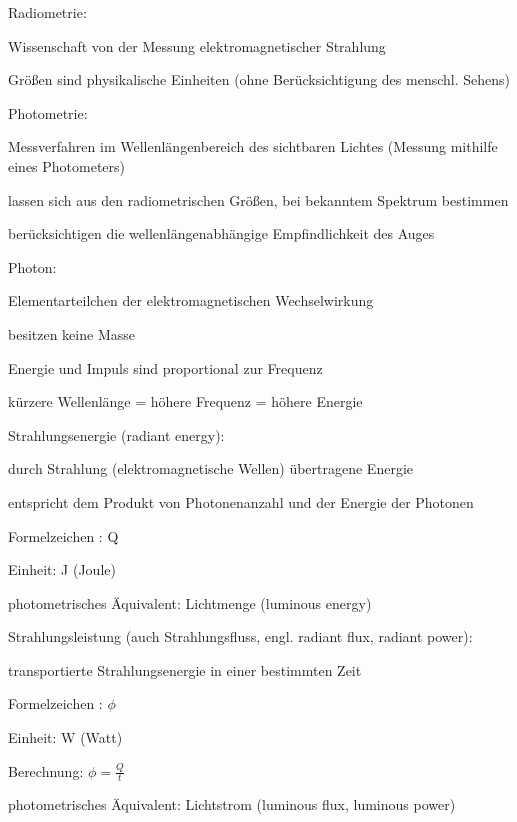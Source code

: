 \documentclass[landscape]{article}
\begin{document}
\begin{multicols}{3}
  Radiometrie:
  \begin{itemize*}
    \item Wissenschaft von der Messung elektromagnetischer Strahlung
    \item Größen sind physikalische Einheiten (ohne Berücksichtigung des menschl. Sehens)
  \end{itemize*}
  
  Photometrie:
  \begin{itemize*}
    \item Messverfahren im Wellenlängenbereich des sichtbaren Lichtes (Messung mithilfe eines Photometers)
    \item lassen sich aus den radiometrischen Größen, bei bekanntem Spektrum bestimmen
    \item berücksichtigen die wellenlängenabhängige Empfindlichkeit des Auges
  \end{itemize*}
  
  Photon:
  \begin{itemize*}
    \item Elementarteilchen der elektromagnetischen Wechselwirkung
    \item besitzen keine Masse
    \item Energie und Impuls sind proportional zur Frequenz
    \item kürzere Wellenlänge = höhere Frequenz = höhere Energie
  \end{itemize*}
  
  Strahlungsenergie (radiant energy):
  \begin{itemize*}
    \item durch Strahlung (elektromagnetische Wellen) übertragene Energie
    \item entspricht dem Produkt von Photonenanzahl und der Energie der Photonen
    \item Formelzeichen : Q
    \item Einheit: J (Joule)
    \item photometrisches Äquivalent: Lichtmenge (luminous energy)
  \end{itemize*}
  
  Strahlungsleistung (auch Strahlungsfluss, engl. radiant flux, radiant power):
  \begin{itemize*}
    \item transportierte Strahlungsenergie in einer bestimmten Zeit
    \item Formelzeichen : $\phi$
    \item Einheit: W (Watt)
    \item Berechnung: $\phi = \frac{Q}{t}$
    \item photometrisches Äquivalent: Lichtstrom (luminous flux, luminous power)
  \end{itemize*}
  

\end{multicols}
\end{document}
